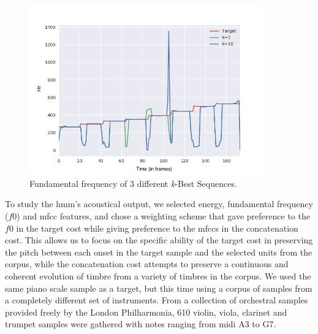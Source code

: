 {{{{{{{{\begin{figure}
	\begin{center}
		\includegraphics[width=0.9\textwidth]{ch05_pyconcat/figures/fundamental.png}
	\end{center}
	\caption[Fundamental frequency of 3 different \textit{k}-Best Sequences]{Fundamental frequency of 3 different \textit{k}-Best Sequences.}
	\label{fig:fundamental}
\end{figure}

To study the \acrshort{hmm}’s acoustical output, we selected energy, fundamental frequency ($f0$) and \acrshort{mfcc} features, and chose a weighting scheme that gave preference to the $f0$ in the target cost while giving preference to the \acrshort{mfcc}s in the concatenation cost. This allows us to focus on the specific ability of the target cost in preserving the pitch between each onset in the target sample and the selected units from the corpus, while the concatenation cost attempts to preserve a continuous and coherent evolution of timbre from a variety of timbres in the corpus. We used the same piano scale sample as a target, but this time using a corpus of samples from a completely different set of instruments. From a collection of orchestral samples provided freely by the London Philharmonia, 610 violin, viola, clarinet and trumpet samples were gathered with notes ranging from \acrshort{midi} A3 to G7.

}}}}}}}}
